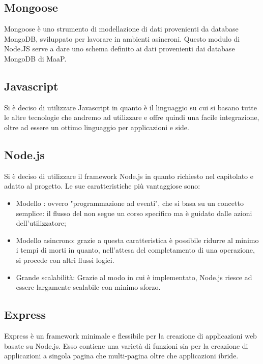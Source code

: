 \subsection{Mongoose}
Mongoose è uno strumento di modellazione di dati provenienti da database MongoDB, sviluppato per lavorare in ambienti asincroni.
Questo modulo di Node.JS serve a dare uno schema definito ai dati provenienti dai database MongoDB di MaaP.

\subsection{Javascript}
Si è deciso di utilizzare Javascript in quanto è il linguaggio su cui si basano tutte le altre tecnologie che andremo ad utilizzare e 
offre quindi una facile integrazione, oltre ad essere un ottimo linguaggio per applicazioni  e  side.

\subsection{Node.js}
Si è deciso di utilizzare il framework Node.js in quanto richiesto nel capitolato e adatto al progetto. 
Le sue caratteristiche più vantaggiose sono:
\begin{itemize}
\item Modello : ovvero "programmazione ad eventi", che si basa su un concetto semplice: il flusso del  non segue un corso specifico ma è guidato dalle azioni dell'utilizzatore;
\item Modello asincrono: grazie a questa caratteristica è possibile ridurre al minimo i tempi di morti in quanto, nell'attesa del completamento di una operazione, si procede con altri flussi logici.
\item Grande scalabilità: Grazie al modo in cui è implementato, Node.js riesce ad essere largamente scalabile con minimo sforzo.
\end{itemize}

\subsection{Express}
Express è un framework minimale e flessibile per la creazione di applicazioni web basate su Node.js. Esso contiene una varietà di funzioni sia per la creazione di applicazioni a singola pagina che multi-pagina oltre che applicazioni ibride.

